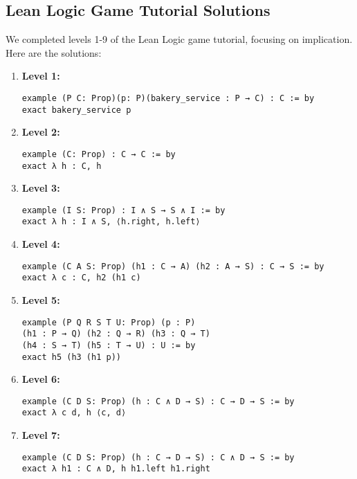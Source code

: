 \documentclass{article}
\begin{document}
\subsection*{Lean Logic Game Tutorial Solutions}

We completed levels 1-9 of the Lean Logic game tutorial, focusing on implication. Here are the solutions:

\begin{enumerate}
    \item \textbf{Level 1:}
    \begin{lstlisting}[style=leanstyle]
example (P C: Prop)(p: P)(bakery_service : P → C) : C := by 
exact bakery_service p
    \end{lstlisting}

    \item \textbf{Level 2:}
    \begin{lstlisting}[style=leanstyle]
example (C: Prop) : C → C := by
exact λ h : C, h
    \end{lstlisting}

    \item \textbf{Level 3:}
    \begin{lstlisting}[style=leanstyle]
example (I S: Prop) : I ∧ S → S ∧ I := by
exact λ h : I ∧ S, ⟨h.right, h.left⟩
    \end{lstlisting}

    \item \textbf{Level 4:}
    \begin{lstlisting}[style=leanstyle]
example (C A S: Prop) (h1 : C → A) (h2 : A → S) : C → S := by
exact λ c : C, h2 (h1 c)
    \end{lstlisting}

    \item \textbf{Level 5:}
    \begin{lstlisting}[style=leanstyle]
example (P Q R S T U: Prop) (p : P)
(h1 : P → Q) (h2 : Q → R) (h3 : Q → T)
(h4 : S → T) (h5 : T → U) : U := by
exact h5 (h3 (h1 p))
    \end{lstlisting}

    \item \textbf{Level 6:}
    \begin{lstlisting}[style=leanstyle]
example (C D S: Prop) (h : C ∧ D → S) : C → D → S := by
exact λ c d, h ⟨c, d⟩
    \end{lstlisting}

    \item \textbf{Level 7:}
    \begin{lstlisting}[style=leanstyle]
example (C D S: Prop) (h : C → D → S) : C ∧ D → S := by
exact λ h1 : C ∧ D, h h1.left h1.right
    \end{lstlisting}


\end{enumerate}
\end{document}
